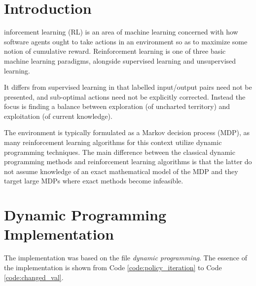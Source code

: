 \documentclass[journal]{IEEEtran}
\begin{document}
\section{Introduction}

inforcement learning (RL) is an area of machine learning
concerned with how software agents ought to take actions in an environment so
as to maximize some notion of cumulative reward. Reinforcement learning is one
of three basic machine learning paradigms, alongside supervised learning
and unsupervised learning.

It differs from supervised learning in that labelled input/output pairs need
not be presented, and sub-optimal actions need not be explicitly corrected.
Instead the focus is finding a balance between exploration (of uncharted
territory) and exploitation (of current knowledge).

The environment is typically formulated as a Markov decision process (MDP),
as many reinforcement learning algorithms for this context utilize dynamic
programming techniques. The main difference between the classical dynamic
programming methods and reinforcement learning algorithms is that the latter
do not assume knowledge of an exact mathematical model of the MDP and they
target large MDPs where exact methods become infeasible.

\section{Dynamic Programming Implementation}

The implementation was based on the file \textit{dynamic programming}.
The essence of the implementation is shown from Code \ref{code:policy_iteration} to Code \ref{code:changed_val}.




\end{document}
